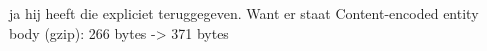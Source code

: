 ja hij heeft die expliciet teruggegeven. Want er staat Content-encoded
entity body (gzip): 266 bytes -> 371 bytes
 